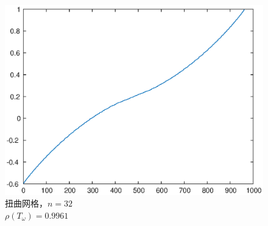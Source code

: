 \documentclass[lang=cn,10pt]{elegantbook}
\begin{document}
\begin{figure}[H]
  \hspace{1em}
  \begin{minipage}[t]{0.28\linewidth}
    \centering
    \includegraphics[width=0.9\linewidth]{figure/3-t-3.eps}
    \caption*{\small 扭曲网格，$n=32$ \\ $\rho(T_\omega)=0.9961$}
  \end{minipage}
\end{figure}
\end{document}
